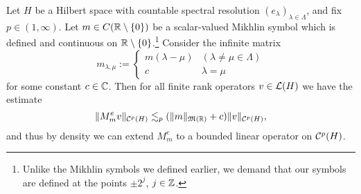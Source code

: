 \begin{thm}\label{thm:Schur-multipliers}
  Let $H$ be a Hilbert space with countable spectral resolution $(e_{\lambda})_{\lambda \in \Lambda}$, and fix $p \in (1,\infty)$.
  Let $m \in C(\mathbb{R} \setminus \{0\})$ be a scalar-valued Mikhlin symbol which is defined and continuous on $\mathbb{R} \setminus \{0\}$.\footnote{Unlike the Mikhlin symbols we defined earlier, we demand that our symbols are defined at the points $\pm 2^{j}$, $j \in \mathbb{Z}$.}
  Consider the infinite matrix
  \begin{equation*}
    m_{\lambda,\mu} :=
    \begin{cases}
      m(\lambda - \mu) & (\lambda \neq \mu \in \Lambda) \\ c & \lambda = \mu
    \end{cases}
  \end{equation*}
  for some constant $c \in \mathbb{C}$.
  Then for all finite rank operators $v \in \mathcal{L}(H)$ we have the estimate
  \begin{equation*}
    \|M_{m}^{e} v\|_{\mathcal{C}^{p}(H)} \lesssim_{p} (\|m\|_{\mathfrak{M}(\mathbb{R})} + c) \|v\|_{\mathcal{C}^{p}(H)},
  \end{equation*}
  and thus by density we can extend $M_{m}^{e}$ to a bounded linear operator on $\mathcal{C}^{p}(H)$.
\end{thm}

